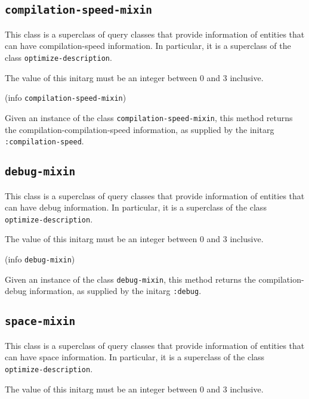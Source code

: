 \subsection{\texttt{compilation-speed-mixin}}
\label{sec-compilation-speed-mixin}

This class is a superclass of query classes that provide information
of entities that can have compilation-speed information.  In particular, it is a
superclass of the class \texttt{optimize-description}.


The value of this initarg must be an integer between $0$ and $3$
inclusive.

 {(info {\tt compilation-speed-mixin})}

Given an instance of the class \texttt{compilation-speed-mixin}, this method
returns the compilation-compilation-speed information, as supplied by the initarg
\texttt{:compilation-speed}.

\subsection{\texttt{debug-mixin}}
\label{sec-debug-mixin}

This class is a superclass of query classes that provide information
of entities that can have debug information.  In particular, it is a
superclass of the class \texttt{optimize-description}.


The value of this initarg must be an integer between $0$ and $3$
inclusive.

 {(info {\tt debug-mixin})}

Given an instance of the class \texttt{debug-mixin}, this method
returns the compilation-debug information, as supplied by the initarg
\texttt{:debug}.

\subsection{\texttt{space-mixin}}
\label{sec-space-mixin}

This class is a superclass of query classes that provide information
of entities that can have space information.  In particular, it is a
superclass of the class \texttt{optimize-description}.


The value of this initarg must be an integer between $0$ and $3$
inclusive.

